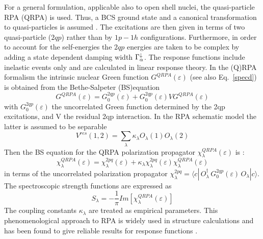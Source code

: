 For a general formulation, applicable also to open shell nuclei, the
quasi-particle RPA (QRPA) is used. Thus, a BCS%
 ground state and a canonical transformation to quasi-particles
is assumed \cite{RS}. The excitations are then given in terms of two
quasi-particle ($2qp$) rather than by $1p-1h$ configurations. Furthermore,
in order to account for the self-energies the $2qp$ energies are taken to be
complex by adding a state dependent damping width $\Gamma_{\alpha}^{%
\downarrow}$. The response functions include inelastic events only and are
calculated in linear response theory. In the (Q)RPA formalism the intrinsic
nuclear Green function $G^{QRPA}(\varepsilon)$ (see also Eq.~\ref{specd}) is
obtained from the Bethe-Salpeter (BS)equation \cite{fetter}
\begin{equation}
G^{QRPA}(\varepsilon) = G_{0}^{2qp}(\varepsilon)+
G_{0}^{2qp}(\varepsilon)VG^{QRPA}(\varepsilon)  \label{bs1}
\end{equation}
with $G_{0}^{2qp}(\varepsilon)$ the uncorrelated Green function determined
by the 2qp excitations, and V the residual 2qp interaction. In the RPA
schematic model the latter is assumed to be separable
\begin{equation}
V^{res}(1,2)=\sum_{\lambda}\kappa _{\lambda}O_{\lambda}(1)O_{\lambda}(2)
\end{equation}
Then the BS equation for the QRPA polarization propagator $%
\chi_{\lambda}^{QRPA}(\varepsilon)$ is \cite{TULnew}:
\begin{equation}
\chi_{\lambda}^{QRPA}(\varepsilon)= \chi_{\lambda}^{2pq}(\varepsilon) +
\kappa_{\lambda}\chi_{\lambda}^{2pq}(\varepsilon)\chi_{\lambda}^{QRPA}(%
\varepsilon)  \label{bs2}
\end{equation}
in terms of the uncorrelated polarization propagator $\chi_{\lambda}^{2pq} =
\langle c|\,O_{\lambda}^{\dagger }\,G_{0}^{2qp}(\varepsilon
)\,O_{\lambda}|c\rangle$. The spectroscopic strength functions are expressed
as
\begin{equation}
S_{\lambda} =-%
\frac{1}{\pi}Im[\chi_{\lambda}^{QRPA}(\varepsilon)]  \label{sprpa}
\end{equation}
The coupling constants $\kappa_{\lambda}$ are treated as empirical
parameters. This phenomenological approach to RPA%
 is widely used in structure calculations and has been found to
give reliable results for response functions \cite{BM,Solv}.

